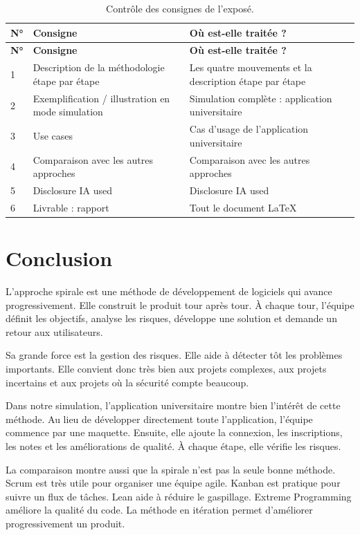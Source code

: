 \documentclass[12pt,a4paper]{article}
\begin{document}
\begin{longtable}{p{} p{} p{}}
\caption{Contrôle des consignes de l'exposé.}\\
\toprule
\textbf{N°} & \textbf{Consigne} & \textbf{Où est-elle traitée ?} \\
\midrule
\endfirsthead
\toprule
\textbf{N°} & \textbf{Consigne} & \textbf{Où est-elle traitée ?} \\
\midrule
\endhead
1 & Description de la méthodologie étape par étape & Les quatre mouvements et la description étape par étape \\
2 & Exemplification / illustration en mode simulation & Simulation complète : application universitaire \\
3 & Use cases & Cas d'usage de l'application universitaire \\
4 & Comparaison avec les autres approches & Comparaison avec les autres approches \\
5 & Disclosure IA used & Disclosure IA used \\
6 & Livrable : rapport & Tout le document LaTeX \\
\bottomrule
\end{longtable}

\newpage

\section{Conclusion}

L'approche spirale est une méthode de développement de logiciels qui avance progressivement. Elle construit le produit tour après tour. À chaque tour, l'équipe définit les objectifs, analyse les risques, développe une solution et demande un retour aux utilisateurs.

Sa grande force est la gestion des risques. Elle aide à détecter tôt les problèmes importants. Elle convient donc très bien aux projets complexes, aux projets incertains et aux projets où la sécurité compte beaucoup.

Dans notre simulation, l'application universitaire montre bien l'intérêt de cette méthode. Au lieu de développer directement toute l'application, l'équipe commence par une maquette. Ensuite, elle ajoute la connexion, les inscriptions, les notes et les améliorations de qualité. À chaque étape, elle vérifie les risques.

La comparaison montre aussi que la spirale n'est pas la seule bonne méthode. Scrum est très utile pour organiser une équipe agile. Kanban est pratique pour suivre un flux de tâches. Lean aide à réduire le gaspillage. Extreme Programming améliore la qualité du code. La méthode en itération permet d'améliorer progressivement un produit.
\end{document}
